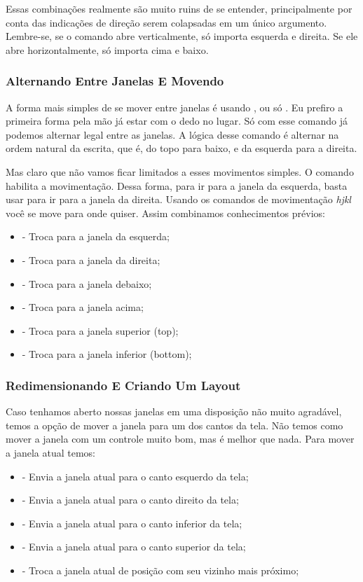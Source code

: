Essas combinações realmente são muito ruins de se entender, principalmente por conta das indicações de direção
serem colapsadas em um único argumento.
Lembre-se, se o comando abre verticalmente, só importa esquerda e direita.
Se ele abre horizontalmente, só importa cima e baixo.

\subsubsection{Alternando Entre Janelas E Movendo}
A forma mais simples de se mover entre janelas é usando , ou só .
Eu prefiro a primeira forma pela mão já estar com o dedo no lugar.
Só com esse comando já podemos alternar legal entre as janelas. 
A lógica desse comando é alternar na ordem natural da escrita, que é, do topo para baixo, e da esquerda para a direita.

Mas claro que não vamos ficar limitados a esses movimentos simples.
O comando  habilita a movimentação.
Dessa forma, para ir para a janela da esquerda, basta usar  para ir para a janela da direita.
Usando os comandos de movimentação \textit{hjkl} você se move para onde quiser.
Assim combinamos conhecimentos prévios:
\begin{itemize}
    \item {} - Troca para a janela da esquerda;
    \item {} - Troca para a janela da direita;
    \item {} - Troca para a janela debaixo;
    \item {} - Troca para a janela acima;
    \item {} - Troca para a janela superior (top);
    \item {} - Troca para a janela inferior (bottom);
\end{itemize}

\subsubsection{Redimensionando E Criando Um Layout}
Caso tenhamos aberto nossas janelas em uma disposição não muito agradável,
temos a opção de mover a janela para um dos cantos da tela.
Não temos como mover a janela com um controle muito bom, mas é melhor que nada.
Para mover a janela atual temos:

\begin{itemize}
    \item {} - Envia a janela atual para o canto esquerdo da tela;
    \item {} - Envia a janela atual para o canto direito da tela;
    \item {} - Envia a janela atual para o canto inferior da tela;
    \item {} - Envia a janela atual para o canto superior da tela;
    \item {} - Troca a janela atual de posição com seu vizinho mais próximo;
\end{itemize}

